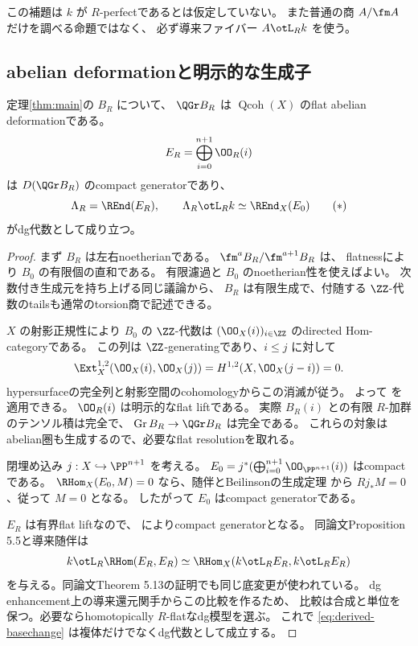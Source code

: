 \begin{remark}
 この補題は \(k\) が \(R\)-perfectであるとは仮定していない。
 また普通の商 \(A/\fm A\) だけを調べる命題ではなく、
 必ず導来ファイバー \(A\otL_Rk\) を使う。
\end{remark}

\subsection{abelian deformationと明示的な生成子}

\begin{proposition}\label{prop:qgr}
 定理\ref{thm:main}の \(B_R\) について、
 \(\QGr B_R\) は \(\operatorname{Qcoh}(X)\) のflat abelian deformationである。
 \[
 E_R=\bigoplus_{i=0}^{n+1}\OO_R(i)
 \]
 は \(D(\QGr B_R)\) のcompact generatorであり、
 \[
 \Lambda_R=\REnd(E_R),\qquad
 \Lambda_R\otL_Rk\simeq\REnd_X(E_0)
 \tag{\(\ast\)}\label{eq:derived-basechange}
 \]
 がdg代数として成り立つ。
\end{proposition}
\begin{proof}
 まず \(B_R\) は左右noetherianである。
 \(\fm^aB_R/\fm^{a+1}B_R\) は、
 flatnessにより \(B_0\) の有限個の直和である。
 有限濾過と \(B_0\) のnoetherian性を使えばよい。
 次数付き生成元を持ち上げる同じ議論から、
 \(B_R\) は有限生成で、付随する \(\ZZ\)-代数のtailsも通常のtorsion商で記述できる。

 \(X\) の射影正規性により \(B_0\) の \(\ZZ\)-代数は
 \((\OO_X(i))_{i\in\ZZ}\) のdirected Hom-categoryである。
 この列は \(\ZZ\)-generatingであり、\(i\le j\) に対して
 \[
 \Ext_X^{1,2}(\OO_X(i),\OO_X(j))
 =H^{1,2}(X,\OO_X(j-i))=0.
 \]
 hypersurfaceの完全列と射影空間のcohomologyからこの消滅が従う。
 よって \cite[Theorem 4.5]{DDL} を適用できる。
 \(\OO_R(i)\) は明示的なflat liftである。
 実際 \(B_R(i)\) との有限 \(R\)-加群のテンソル積は完全で、
 \(\operatorname{Gr}B_R\to\QGr B_R\) は完全である。
 これらの対象はabelian圏も生成するので、必要なflat resolutionを取れる。

 閉埋め込み \(j:X\hookrightarrow\PP^{n+1}\) を考える。
 \(E_0=j^*(\bigoplus_{i=0}^{n+1}\OO_{\PP^{n+1}}(i))\) はcompactである。
 \(\RHom_X(E_0,M)=0\) なら、随伴とBeilinsonの生成定理
 \cite{Beilinson}から \(Rj_*M=0\)、従って \(M=0\) となる。
 したがって \(E_0\) はcompact generatorである。

 \(E_R\) は有界flat liftなので、
 \cite[Propositions 5.8, 5.9]{DDL} によりcompact generatorとなる。
 同論文Proposition 5.5と導来随伴は
 \[
 k\otL_R\RHom(E_R,E_R)
 \simeq\RHom_X(k\otL_RE_R,k\otL_RE_R)
 \]
 を与える。同論文Theorem 5.13の証明でも同じ底変更が使われている。
 dg enhancement上の導来還元関手からこの比較を作るため、
 比較は合成と単位を保つ。必要ならhomotopically \(R\)-flatなdg模型を選ぶ。
 これで \eqref{eq:derived-basechange} は複体だけでなくdg代数として成立する。
\end{proof}

